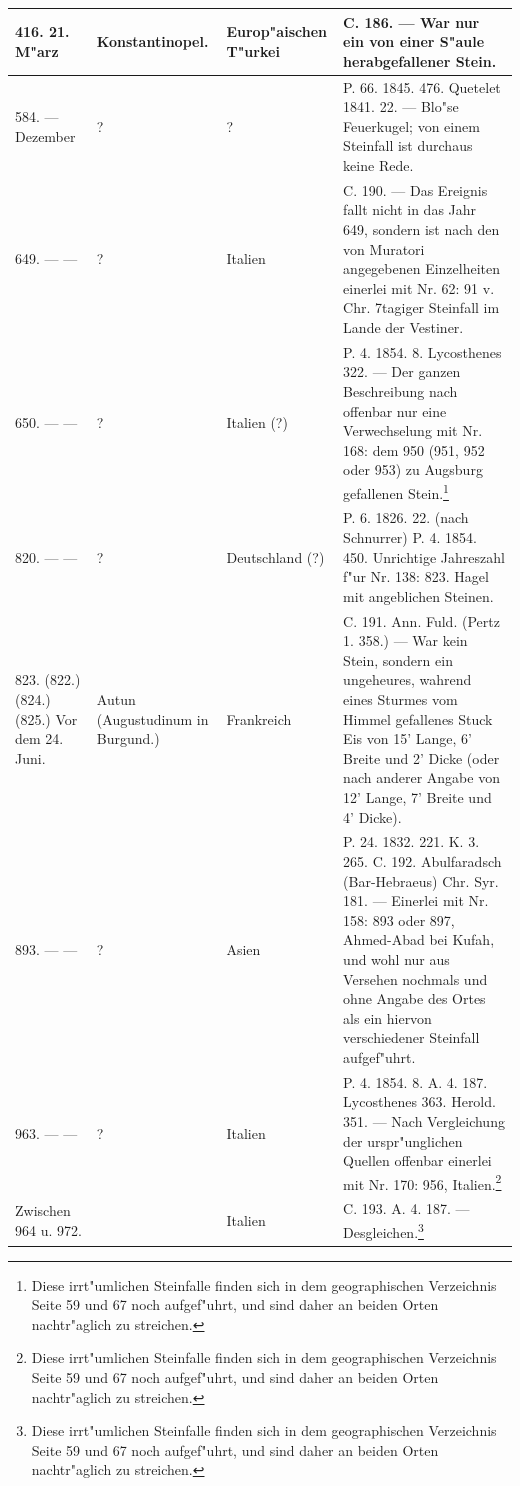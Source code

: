 \documentclass[a4paper, 8pt, oneside, polutonikogreek, german]{article}
\begin{document}
\begin{center}
\begin{longtable}{| p{20mm} | p{25mm} | p{20mm} | p{55mm} |}
        416. 21. M"arz & Konstantinopel. & Europ"aischen T"urkei & C. 186. --- War nur ein von einer S"aule herabgefallener Stein. \\ \hline
        584. --- Dezember & ? & ? & P. 66. 1845. 476. Quetelet 1841. 22. --- Blo"se Feuerkugel; von einem Steinfall ist durchaus keine Rede. \\ \hline
        649. --- --- & ? & Italien & C. 190. --- Das Ereignis fallt nicht in das Jahr 649, sondern ist nach den von Muratori angegebenen Einzelheiten einerlei mit Nr. 62: 91 v. Chr. 7tagiger Steinfall im Lande der Vestiner. \\ \hline
        650. --- --- & ? & Italien (?) & P. 4. 1854. 8. Lycosthenes 322. --- Der ganzen Beschreibung nach offenbar nur eine Verwechselung mit Nr. 168: dem 950 (951, 952 oder 953) zu Augsburg gefallenen Stein.\footnote{Diese irrt"umlichen Steinfalle finden sich in dem geographischen Verzeichnis Seite 59 und 67 noch aufgef"uhrt, und sind daher an beiden Orten nachtr"aglich zu streichen.} \\ \hline
        820. --- --- & ? & Deutschland (?) & P. 6. 1826. 22. (nach Schnurrer) P. 4. 1854. 450. Unrichtige Jahreszahl f"ur Nr. 138: 823. Hagel mit angeblichen Steinen. \\ \hline
        823. (822.) (824.) (825.) Vor dem 24. Juni. & Autun (Augustudinum in Burgund.) & Frankreich & C. 191. Ann. Fuld. (Pertz 1. 358.) --- War kein Stein, sondern ein ungeheures, wahrend eines Sturmes vom Himmel gefallenes Stuck Eis von 15' Lange, 6' Breite und 2' Dicke (oder nach anderer Angabe von 12' Lange, 7' Breite und 4' Dicke). \\ \hline
        893. --- --- & ? & Asien & P. 24. 1832. 221. K. 3. 265. C. 192. Abulfaradsch (Bar-Hebraeus) Chr. Syr. 181. --- Einerlei mit Nr. 158: 893 oder 897, Ahmed-Abad bei Kufah, und wohl nur aus Versehen nochmals und ohne Angabe des Ortes als ein hiervon verschiedener Steinfall aufgef"uhrt. \\ \hline
        963. --- --- & ? & Italien & P. 4. 1854. 8. A. 4. 187. Lycosthenes 363. Herold. 351. --- Nach Vergleichung der urspr"unglichen Quellen offenbar einerlei mit Nr. 170: 956, Italien.\footnote{Diese irrt"umlichen Steinfalle finden sich in dem geographischen Verzeichnis Seite 59 und 67 noch aufgef"uhrt, und sind daher an beiden Orten nachtr"aglich zu streichen.} \\ \hline
        Zwischen 964 u. 972. & ~ & Italien & C. 193. A. 4. 187. --- Desgleichen.\footnote{Diese irrt"umlichen Steinfalle finden sich in dem geographischen Verzeichnis Seite 59 und 67 noch aufgef"uhrt, und sind daher an beiden Orten nachtr"aglich zu streichen.} \\ \hline

\end{longtable}
\end{center}
\end{document}
